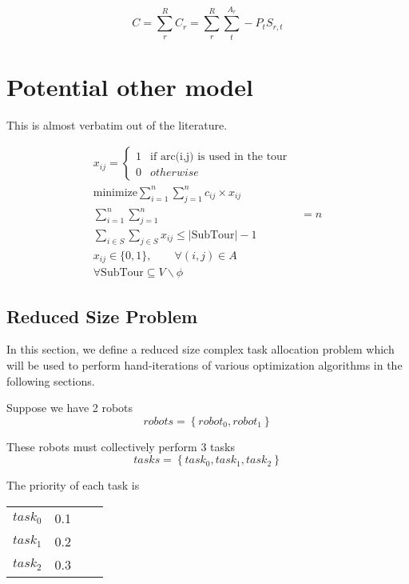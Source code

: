 \documentclass[a4paper]{article}
\begin{document}
$$C = \sum_r^{R} C_r = \sum_r^{R} \sum_t^{A_r} -P_t S_{r,t}$$

\section{Potential other model}

This is almost verbatim out of the literature.

\begin{align}
x_{ij} = \begin{cases}
      1 & \text{if arc(i,j) is used in the tour} \\
      0 & otherwise
   \end{cases} \\
\text{minimize} \sum_{i=1}^n \sum_{j=1}^n c_{ij} \times x_{ij} \\
\sum_{i=1}^n \sum_{j=1}^n &= n \\
\sum_{i \in S} \sum_{j \in S} x_{ij} \le |\text{SubTour}| - 1 \\
x_{ij} \in \{0, 1\},\qquad \forall (i, j) \in A \\
\forall \text{SubTour} \subseteq V \backslash \phi
\end{align}
\subsection{Reduced Size Problem}



In this section, we define a reduced size complex task allocation problem which
will be used to perform hand-iterations of various optimization algorithms in
the following sections.

Suppose we have 2 robots
$$\mathit{robots} = \left\{ \mathit{robot}_0, \mathit{robot}_1 \right\}$$

These robots must collectively perform 3 tasks
$$\mathit{tasks} = \left\{ \mathit{task}_0, \mathit{task}_1,  \mathit{task}_2 \right\}$$

The priority of each task is

\begin{tabular}{llll}
$\mathit{task}_0$  & 0.1 \\
$\mathit{task}_1$  & 0.2 \\
$\mathit{task}_2$  & 0.3 \\
\end{tabular}
\vspace{1.5em}
\end{document}

